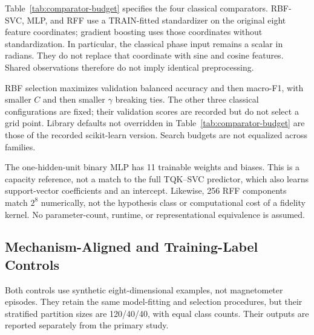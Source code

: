 

Table~\ref{tab:comparator-budget} specifies the four classical comparators. RBF-SVC, MLP, and RFF use a TRAIN-fitted standardizer on the original eight feature coordinates; gradient boosting uses those coordinates without standardization. In particular, the classical phase input remains a scalar in radians. They do not replace that coordinate with sine and cosine features. Shared observations therefore do not imply identical preprocessing.

RBF selection maximizes validation balanced accuracy and then macro-F1, with smaller $C$ and then smaller $\gamma$ breaking ties. The other three classical configurations are fixed; their validation scores are recorded but do not select a grid point. Library defaults not overridden in Table~\ref{tab:comparator-budget} are those of the recorded scikit-learn version. Search budgets are not equalized across families.

The one-hidden-unit binary MLP has 11 trainable weights and biases. This is a capacity reference, not a match to the full TQK--SVC predictor, which also learns support-vector coefficients and an intercept. Likewise, 256 RFF components match $2^8$ numerically, not the hypothesis class or computational cost of a fidelity kernel. No parameter-count, runtime, or representational equivalence is assumed.

\subsection{Mechanism-Aligned and Training-Label Controls}
\label{sec:methods-controls}

Both controls use synthetic eight-dimensional examples, not magnetometer episodes. They retain the same model-fitting and selection procedures, but their stratified partition sizes are 120/40/40, with equal class counts. Their outputs are reported separately from the primary study.

